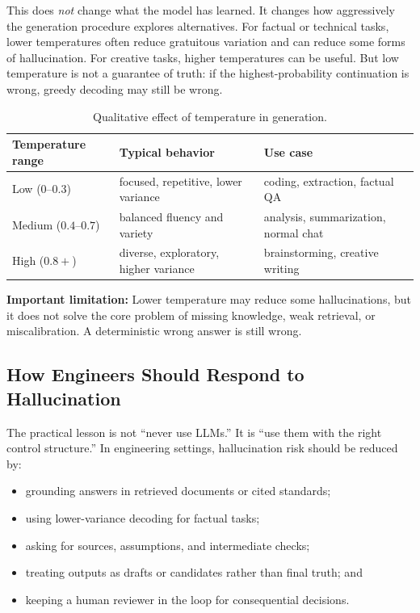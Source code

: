\documentclass[12pt]{article}
\begin{document}
This does \emph{not} change what the model has learned. It changes how aggressively the generation procedure explores alternatives. For factual or technical tasks, lower temperatures often reduce gratuitous variation and can reduce some forms of hallucination. For creative tasks, higher temperatures can be useful. But low temperature is not a guarantee of truth: if the highest-probability continuation is wrong, greedy decoding may still be wrong.

\begin{table}[ht]
    \centering
    \caption{Qualitative effect of temperature in generation.}
    \label{t15tab:temperature}
    \begin{tabulary}{\textwidth}{L L L}
        \toprule
        \textbf{Temperature range} & \textbf{Typical behavior} & \textbf{Use case} \\
        \midrule
        Low ($0$--$0.3$) & focused, repetitive, lower variance & coding, extraction, factual QA \\
        Medium ($0.4$--$0.7$) & balanced fluency and variety & analysis, summarization, normal chat \\
        High ($0.8+$) & diverse, exploratory, higher variance & brainstorming, creative writing \\
        \bottomrule
    \end{tabulary}
\end{table}

\begin{alert-box}
\textbf{Important limitation:} Lower temperature may reduce some hallucinations, but it does not solve the core problem of missing knowledge, weak retrieval, or miscalibration. A deterministic wrong answer is still wrong.
\end{alert-box}

\subsection{How Engineers Should Respond to Hallucination}

The practical lesson is not ``never use LLMs.'' It is ``use them with the right control structure.'' In engineering settings, hallucination risk should be reduced by:
\begin{itemize}
    \item grounding answers in retrieved documents or cited standards;
    \item using lower-variance decoding for factual tasks;
    \item asking for sources, assumptions, and intermediate checks;
    \item treating outputs as drafts or candidates rather than final truth; and
    \item keeping a human reviewer in the loop for consequential decisions.
\end{itemize}
\end{document}
